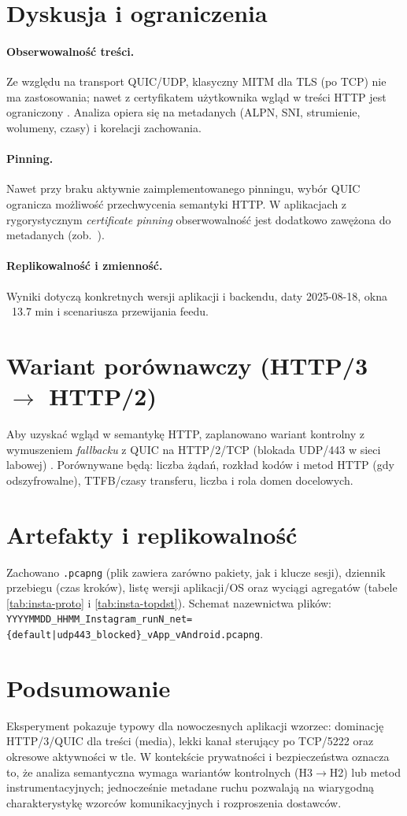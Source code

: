 \section{Dyskusja i ograniczenia}
\paragraph{Obserwowalność treści.}
Ze względu na transport QUIC/UDP, klasyczny MITM dla TLS (po TCP) nie ma zastosowania; nawet z certyfikatem użytkownika wgląd w treści HTTP jest ograniczony \cite{RFC9114}. Analiza opiera się na metadanych (ALPN, SNI, strumienie, wolumeny, czasy) i korelacji zachowania.
\paragraph{Pinning.}
Nawet przy braku aktywnie zaimplementowanego pinningu, wybór QUIC ogranicza możliwość przechwycenia semantyki HTTP. W aplikacjach z rygorystycznym \emph{certificate pinning} obserwowalność jest dodatkowo zawężona do metadanych (zob.\ \cite{OWASPMASTGPinning}).
\paragraph{Replikowalność i zmienność.}
Wyniki dotyczą konkretnych wersji aplikacji i backendu, daty 2025-08-18, okna ~13.7 min i scenariusza przewijania feedu.

\section{Wariant porównawczy (HTTP/3 $\rightarrow$ HTTP/2)}
Aby uzyskać wgląd w semantykę HTTP, zaplanowano wariant kontrolny z wymuszeniem \emph{fallbacku} z QUIC na HTTP/2/TCP (blokada UDP/443 w sieci labowej) \cite{RFC9114}. Porównywane będą: liczba żądań, rozkład kodów i metod HTTP (gdy odszyfrowalne), TTFB/czasy transferu, liczba i rola domen docelowych.

\section{Artefakty i replikowalność}
Zachowano \texttt{.pcapng} (plik zawiera zarówno pakiety, jak i klucze sesji), dziennik przebiegu (czas kroków), listę wersji aplikacji/OS oraz wyciągi agregatów (tabele \ref{tab:insta-proto} i \ref{tab:insta-topdst}). Schemat nazewnictwa plików: \texttt{YYYYMMDD\_HHMM\_Instagram\_runN\_net=\{default|udp443\_blocked\}\_vApp\_vAndroid.pcapng}.

\section{Podsumowanie}
Eksperyment pokazuje typowy dla nowoczesnych aplikacji wzorzec: dominację HTTP/3/QUIC dla treści (media), lekki kanał sterujący po TCP/5222 oraz okresowe aktywności w tle. W kontekście prywatności i bezpieczeństwa oznacza to, że analiza semantyczna wymaga wariantów kontrolnych (H3$\rightarrow$H2) lub metod instrumentacyjnych; jednocześnie metadane ruchu pozwalają na wiarygodną charakterystykę wzorców komunikacyjnych i rozproszenia dostawców.
